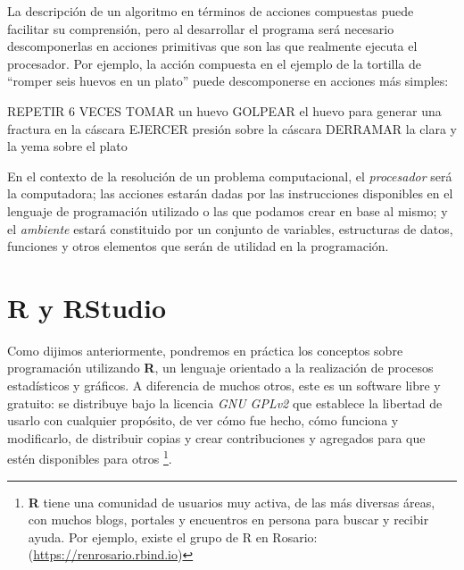 \documentclass[
]{book}
\newenvironment{Shaded}{\begin{snugshade}}{\end{snugshade}}
\newcommand{\NormalTok}[1]{#1}
\begin{document}
La descripción de un algoritmo en términos de acciones compuestas puede facilitar su comprensión, pero al desarrollar el programa será necesario descomponerlas en acciones primitivas que son las que realmente ejecuta el procesador. Por ejemplo, la acción compuesta en el ejemplo de la tortilla de ``romper seis huevos en un plato'' puede descomponerse en acciones más simples:

\begin{Shaded}
\begin{Highlighting}[]
\NormalTok{REPETIR 6 VECES}
\NormalTok{    TOMAR un huevo}
\NormalTok{    GOLPEAR el huevo para generar una fractura en la cáscara}
\NormalTok{    EJERCER presión sobre la cáscara}
\NormalTok{    DERRAMAR la clara y la yema sobre el plato}
\end{Highlighting}
\end{Shaded}

En el contexto de la resolución de un problema computacional, el \emph{procesador} será la computadora; las acciones estarán dadas por las instrucciones disponibles en el lenguaje de programación utilizado o las que podamos crear en base al mismo; y el \emph{ambiente} estará constituido por un conjunto de variables, estructuras de datos, funciones y otros elementos que serán de utilidad en la programación.

\hypertarget{r-y-rstudio}{%
\section{R y RStudio}\label{r-y-rstudio}}

Como dijimos anteriormente, pondremos en práctica los conceptos sobre programación utilizando \textbf{R}, un lenguaje orientado a la realización de procesos estadísticos y gráficos. A diferencia de muchos otros, este es un software libre y gratuito: se distribuye bajo la licencia \emph{GNU GPLv2} que establece la libertad de usarlo con cualquier propósito, de ver cómo fue hecho, cómo funciona y modificarlo, de distribuir copias y crear contribuciones y agregados para que estén disponibles para otros \footnote{\textbf{R} tiene una comunidad de usuarios muy activa, de las más diversas áreas, con muchos blogs, portales y encuentros en persona para buscar y recibir ayuda. Por ejemplo, existe el grupo de R en Rosario: (\url{https://renrosario.rbind.io})}.
\end{document}
